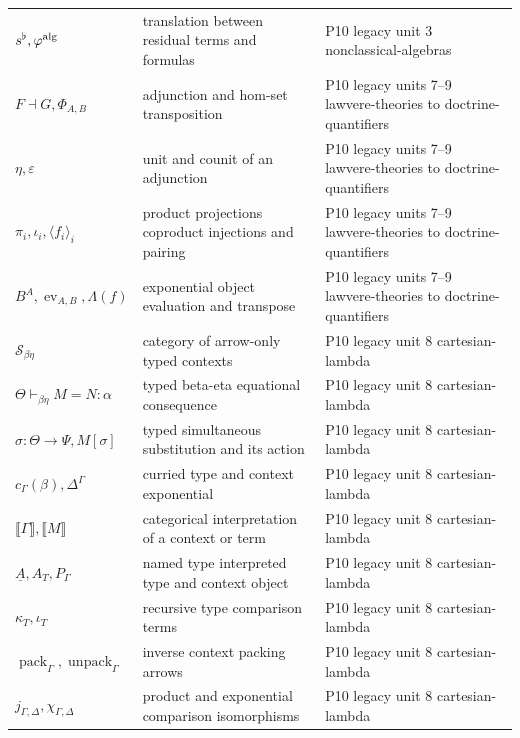 \begin{longtable}{@{}p{}p{}p{}@{}}
\(s^\flat,\allowbreak \varphi^{\rm alg}\) & translation between residual terms and formulas & P10 legacy unit 3 nonclassical-\allowbreak{}algebras \\
\(F\dashv G,\allowbreak \Phi_{A,B}\) & adjunction and hom-set transposition & P10 legacy units 7--9 lawvere-\allowbreak{}theories to doctrine-\allowbreak{}quantifiers \\
\(\eta,\allowbreak \varepsilon\) & unit and counit of an adjunction & P10 legacy units 7--9 lawvere-\allowbreak{}theories to doctrine-\allowbreak{}quantifiers \\
\(\pi_i,\allowbreak \iota_i,\allowbreak \langle f_i\rangle_i\) & product projections coproduct injections and pairing & P10 legacy units 7--9 lawvere-\allowbreak{}theories to doctrine-\allowbreak{}quantifiers \\
\(B^A,\allowbreak \operatorname{ev}_{A,B},\allowbreak \Lambda(f)\) & exponential object evaluation and transpose & P10 legacy units 7--9 lawvere-\allowbreak{}theories to doctrine-\allowbreak{}quantifiers \\
\(\mathcal S_{\beta\eta}\) & category of arrow-only typed contexts & P10 legacy unit 8 cartesian-\allowbreak{}lambda \\
\(\Theta\vdash_{\beta\eta}M=N:\alpha\) & typed beta-eta equational consequence & P10 legacy unit 8 cartesian-\allowbreak{}lambda \\
\(\sigma:\Theta\to\Psi,\allowbreak M[\sigma]\) & typed simultaneous substitution and its action & P10 legacy unit 8 cartesian-\allowbreak{}lambda \\
\(c_\Gamma(\beta),\allowbreak \Delta^\Gamma\) & curried type and context exponential & P10 legacy unit 8 cartesian-\allowbreak{}lambda \\
\(\llbracket\Gamma\rrbracket,\allowbreak \llbracket M\rrbracket\) & categorical interpretation of a context or term & P10 legacy unit 8 cartesian-\allowbreak{}lambda \\
\(\underline A,\allowbreak A_T,\allowbreak P_\Gamma\) & named type interpreted type and context object & P10 legacy unit 8 cartesian-\allowbreak{}lambda \\
\(\kappa_T,\allowbreak \iota_T\) & recursive type comparison terms & P10 legacy unit 8 cartesian-\allowbreak{}lambda \\
\(\operatorname{pack}_\Gamma,\allowbreak \operatorname{unpack}_\Gamma\) & inverse context packing arrows & P10 legacy unit 8 cartesian-\allowbreak{}lambda \\
\(j_{\Gamma,\Delta},\allowbreak \chi_{\Gamma,\Delta}\) & product and exponential comparison isomorphisms & P10 legacy unit 8 cartesian-\allowbreak{}lambda \\

\end{longtable}
